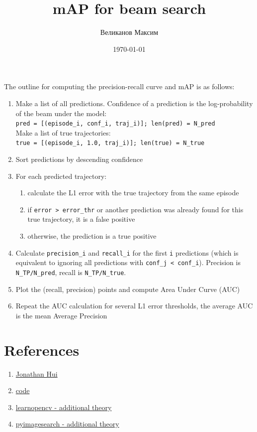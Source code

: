 \documentclass[addpoints]{exam}
\title{mAP for beam search}
\author{Великанов Максим}
\date{\today}
\begin{document}
    \maketitle


    The outline for computing the precision-recall curve and mAP is as follows:
    \begin{enumerate}
    	\item Make a list of all predictions. Confidence of a prediction is the log-probability of the beam under the model:\\
    	\verb|pred = [(episode_i, conf_i, traj_i)]; len(pred) = N_pred|\\
    	Make a list of true trajectories:\\
    	\verb|true = [(episode_i, 1.0, traj_i)]; len(true) = N_true|
    	\item Sort predictions by descending confidence
    	\item For each predicted trajectory:
    	\begin{enumerate}
    		\item calculate the L1 error with the true trajectory from the same episode
    		\item if \verb|error > error_thr| or another prediction was already found for this true trajectory, it is a false positive
    		\item otherwise, the prediction is a true positive
    	\end{enumerate}
    	\item Calculate \verb|precision_i| and \verb|recall_i| for the first \verb|i| predictions (which is equivalent to ignoring all predictions with \verb|conf_j < conf_i|). Precision is \verb|N_TP/N_pred|, recall is \verb|N_TP/N_true|.
    	\item Plot the (recall, precision) points and compute Area Under Curve (AUC)
    	\item Repeat the AUC calculation for several L1 error thresholds, the average AUC is the mean Average Precision
    \end{enumerate}
    
    
    \section{References}
    \begin{enumerate}
    	\item \href{https://jonathan-hui.medium.com/map-mean-average-precision-for-object-detection-45c121a31173}{Jonathan Hui}
    	\item \href{https://github.com/matin-ghorbani/Mean-Average-Precision-from-Scratch/blob/main/mAP.py}{code}
	    \item \href{https://learnopencv.com/mean-average-precision-map-object-detection-model-evaluation-metric/}{learnopencv - additional theory}
	    \item \href{https://pyimagesearch.com/2022/05/02/mean-average-precision-map-using-the-coco-evaluator/}{pyimagesearch - additional theory}
	\end{enumerate}
\end{document}
